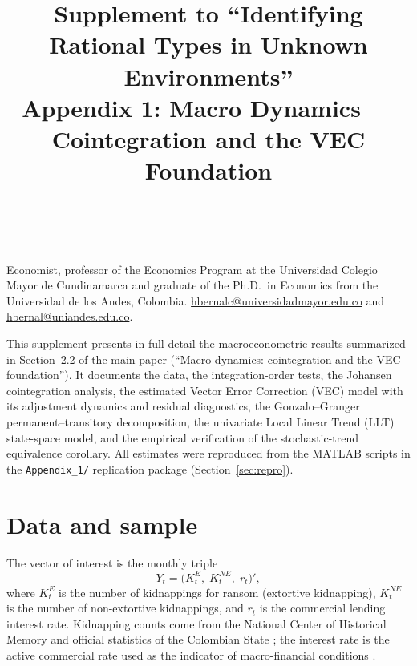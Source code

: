 \documentclass[ecta,nameyear,final,supplement]{econsocart}
\numberwithin{equation}{section}
\numberwithin{table}{section}
\theoremstyle{definition}
\newcommand{\KE}{K^{E}}
\newcommand{\KNE}{K^{NE}}
\begin{document}
\begin{frontmatter}

\title{Supplement to ``Identifying Rational Types in Unknown Environments''\\
Appendix 1: Macro Dynamics --- Cointegration and the VEC Foundation}

\begin{aug}
\author[add1,add2]{~}
\address[add1]{%
,
}
\address[add2]{%
,
}
\end{aug}

\begin{funding}
Economist, professor of the Economics Program at the Universidad Colegio
Mayor de Cundinamarca and graduate of the Ph.D.\ in Economics from the
Universidad de los Andes, Colombia.
\href{mailto:hbernalc@universidadmayor.edu.co}{hbernalc@universidadmayor.edu.co}
and \href{mailto:hbernal@uniandes.edu.co}{hbernal@uniandes.edu.co}.
\end{funding}

\end{frontmatter}

\noindent
This supplement presents in full detail the macroeconometric results
summarized in Section~2.2 of the main paper (``Macro dynamics: cointegration
and the VEC foundation''). It documents the data, the
integration-order tests, the Johansen cointegration analysis, the estimated
Vector Error Correction (VEC) model with its adjustment dynamics and residual
diagnostics, the Gonzalo--Granger permanent--transitory decomposition, the
univariate Local Linear Trend (LLT) state-space model, and the empirical
verification of the stochastic-trend equivalence corollary. All estimates
were reproduced from the MATLAB scripts in the \texttt{Appendix\_1/}
replication package (Section~\ref{sec:repro}).

\section{Data and sample}
\label{sec:data}

The vector of interest is the monthly triple
\begin{equation}
Y_t = \bigl(\KE_t,\; \KNE_t,\; r_t\bigr)',
\label{eq:vector}
\end{equation}
where $\KE_t$ is the number of kidnappings for ransom (extortive kidnapping),
$\KNE_t$ is the number of non-extortive kidnappings, and $r_t$ is the
commercial lending interest rate. Kidnapping counts come from the National
Center of Historical Memory \citep{CNMH2013,cnmh_datos} and official
statistics of the Colombian State \citep{mindefensa_stats}; the interest rate
is the active commercial rate used as the indicator of macro-financial
conditions \citep{Masih1995,Suarez_2025}.
\end{document}
